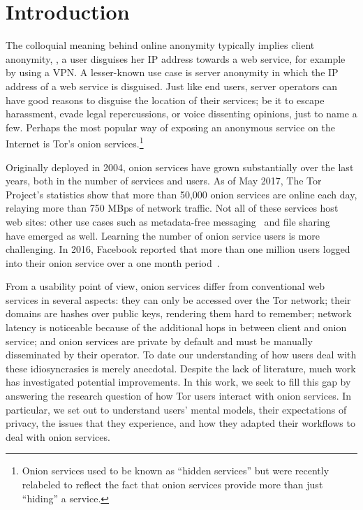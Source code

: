 \section{Introduction}
\label{sec:introduction}

The colloquial meaning behind online anonymity typically implies client
anonymity, \ie, a user disguises her IP address towards a web service, for
example by using a VPN.  A lesser-known use case is server anonymity in which
the IP address of a web service is disguised.  Just like end users, server
operators can have good reasons to disguise the location of their services; be
it to escape harassment, evade legal repercussions, or voice dissenting
opinions, just to name a few.  Perhaps the most popular way of exposing an
anonymous service on the Internet is Tor's onion services.\footnote{Onion
services used to be known as ``hidden services'' but were recently relabeled to
reflect the fact that onion services provide more than just ``hiding'' a
service.}

Originally deployed in 2004, onion services have grown substantially over the
last years, both in the number of services and users.  As of May 2017, The Tor
Project's statistics show that more than 50,000 onion services are online each
day, relaying more than 750 MBps of network traffic.  Not all of these services
host web sites: other use cases such as metadata-free
messaging~\cite{ricochet} and file sharing~\cite{onionshare} have emerged as
well.  Learning the number of onion service users is more challenging.  In 2016,
Facebook reported that more than one million users logged into their onion
service over a one month period~\cite{facebook-users}.

From a usability point of view, onion services differ from conventional web
services in several aspects: \first they can only be accessed over the Tor
network; \second their domains are hashes over public keys, rendering them hard
to remember; \third network latency is noticeable because of the additional hops
in between client and onion service; and \fourth onion services are private by
default and must be manually disseminated by their operator. To date our
understanding of how users deal with these idiosyncrasies is merely anecdotal.
Despite the lack of literature, much work has investigated potential
improvements.  In this work, we seek to fill this gap by answering the research
question of how Tor users interact with onion services.  In particular, we set
out to understand users' mental models, their expectations of privacy, the issues
that they experience, and how they adapted their workflows to deal with onion
services.

